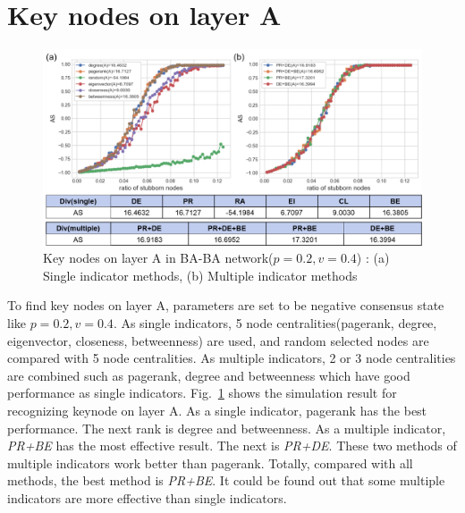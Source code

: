 \section{Key nodes on layer A}
\begin{figure}[!htb]
	\centering
	\includegraphics[width=\hsize]{figure/chap5_keynode_A.png}
	\caption{Key nodes on layer A in BA-BA network($p=0.2, v=0.4$) : (a) Single indicator methods, (b) Multiple indicator methods}
	\label{chap5_keynode_A}
\end{figure}
To find key nodes on layer A, parameters are set to be negative consensus state like $p=0.2, v=0.4$.  As single indicators, 5 node centralities(pagerank, degree, eigenvector, closeness, betweenness) are used, and random selected nodes are compared with 5 node centralities. As multiple indicators, 2 or 3 node centralities are combined such as pagerank, degree and betweenness which have good performance as single indicators.  
Fig.~\ref{chap5_keynode_A} shows the simulation result for recognizing keynode on layer A. As a single indicator, pagerank has the best performance. The next rank is degree and betweenness. As a multiple indicator, \textit{PR+BE} has the most effective result. The next is \textit{PR+DE}. These two methods of multiple indicators work better than pagerank. Totally, compared with all methods, the best method is \textit{PR+BE}. It could be found out that some multiple indicators are more effective than single indicators. 

